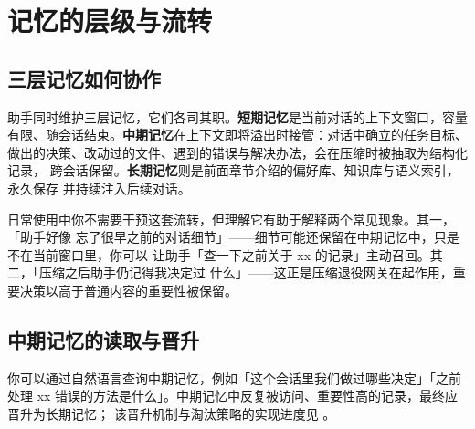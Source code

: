 \section{记忆的层级与流转}\label{sec:tiers}

\subsection{三层记忆如何协作}

助手同时维护三层记忆，它们各司其职。\textbf{短期记忆}是当前对话的上下文窗口，容量
有限、随会话结束。\textbf{中期记忆}在上下文即将溢出时接管：对话中确立的任务目标、
做出的决策、改动过的文件、遇到的错误与解决办法，会在压缩时被抽取为结构化记录，
跨会话保留。\textbf{长期记忆}则是前面章节介绍的偏好库、知识库与语义索引，永久保存
并持续注入后续对话。

日常使用中你不需要干预这套流转，但理解它有助于解释两个常见现象。其一，「助手好像
忘了很早之前的对话细节」——细节可能还保留在中期记忆中，只是不在当前窗口里，你可以
让助手「查一下之前关于 xx 的记录」主动召回。其二，「压缩之后助手仍记得我决定过
什么」——这正是压缩退役网关在起作用，重要决策以高于普通内容的重要性被保留。

\subsection{中期记忆的读取与晋升}

你可以通过自然语言查询中期记忆，例如「这个会话里我们做过哪些决定」「之前处理 xx
错误的方法是什么」。中期记忆中反复被访问、重要性高的记录，最终应晋升为长期记忆；
该晋升机制与淘汰策略的实现进度见 。
